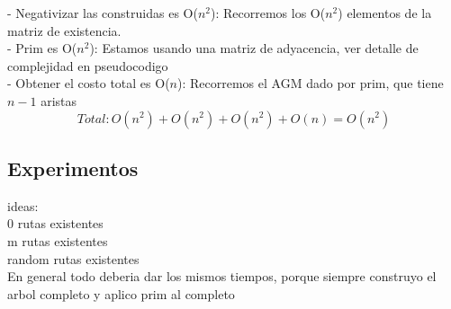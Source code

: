 - Negativizar las construidas es O($n^2$): Recorremos los O($n^2$) elementos de la matriz de existencia. \\

- Prim es O($n^2$): Estamos usando una matriz de adyacencia, ver detalle de complejidad en pseudocodigo\\

- Obtener el costo total es O($n$): Recorremos el AGM dado por prim, que tiene $n-1$ aristas \\

$$Total:  O(n^2) + O(n^2) + O(n^2) + O(n) = O(n^2) $$

\subsection{Experimentos}

ideas:\\
0 rutas existentes\\
m rutas existentes\\
random rutas existentes\\

En general todo deberia dar los mismos tiempos, porque siempre construyo el arbol completo y aplico prim al completo